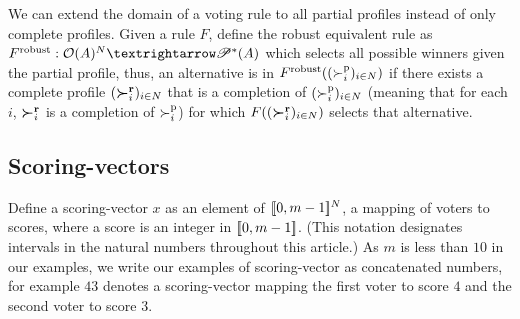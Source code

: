 \documentclass[version=last, pagesize, twoside=off, bibliography=totoc, DIV=calc, fontsize=14pt, a4paper, french, english]{scrartcl}
\begin{document}
We can extend the domain of a voting rule to all partial profiles instead of only complete profiles. Given a rule $F$, define the robust equivalent rule as $F^\text{robust}: \allpprofs → \powersetz{\alts}$ which selects all possible winners given the partial profile, thus, an alternative is in $F^\text{robust}((\succ_i^\text{p})_{i \in N})$ if there exists a complete profile $(\boldsymbol{\succ}^\textbf{r}_i)_{i \in N}$ that is a completion of $(\succ_i^\text{p})_{i \in N}$ (meaning that for each $i$, $\boldsymbol{\succ}^\textbf{r}_i$ is a completion of $\succ^\text{p}_i$) for which $F((\boldsymbol{\succ}^\textbf{r}_i)_{i \in N})$ selects that alternative.

\subsection{Scoring-vectors}
Define a scoring-vector $x$ as an element of $\lbrack\!\lbrack{}0, m-1\rbrack\!\rbrack^N$, a mapping of voters to scores, where a score is an integer in $\lbrack\!\lbrack{}0, m-1\rbrack\!\rbrack$. (This notation designates intervals in the natural numbers throughout this article.) As $m$ is less than $10$ in our examples, we write our examples of scoring-vector as concatenated numbers, for example $43$ denotes a scoring-vector mapping the first voter to score $4$ and the second voter to score $3$.
\end{document}
